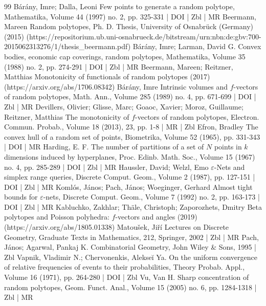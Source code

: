 \documentclass[10pt]{amsart}
\theoremstyle{definition}\newtheorem{defi}[theo]{Definition}\newtheorem{rema}[theo]{Remark}\newtheorem{exam}[theo]{Example}\newtheorem{exem}[theo]{Example}\newtheorem{nota}[theo]{Notation}
\begin{document}
\begin{thebibliography}{99}
Bárány, Imre; Dalla, Leoni Few points to generate a random polytope, Mathematika, Volume 44 (1997) no. 2, pp. 325-331 | DOI | Zbl | MR
Beermann, Mareen Random polytopes, Ph. D. Thesis, University of Osnabrück (Germany) (2015) (https://repositorium.ub.uni-osnabrueck.de/bitstream/urn:nbn:de:gbv:700-2015062313276/1/thesis\_beermann.pdf)
Bárány, Imre; Larman, David G. Convex bodies, economic cap coverings, random polytopes, Mathematika, Volume 35 (1988) no. 2, pp. 274-291 | DOI | Zbl | MR
Beermann, Mareen; Reitzner, Matthias Monotonicity of functionals of random polytopes (2017) (https://arxiv.org/abs/1706.08342)
Bárány, Imre Intrinsic volumes and $f$-vectors of random polytopes, Math. Ann., Volume 285 (1989) no. 4, pp. 671-699 | DOI | Zbl | MR
Devillers, Olivier; Glisse, Marc; Goaoc, Xavier; Moroz, Guillaume; Reitzner, Matthias The monotonicity of $f$-vectors of random polytopes, Electron. Commun. Probab., Volume 18 (2013), 23, pp. 1-8 | MR | Zbl
Efron, Bradley The convex hull of a random set of points, Biometrika, Volume 52 (1965), pp. 331-343 | DOI | MR
Harding, E. F. The number of partitions of a set of ${N}$ points in $k$ dimensions induced by hyperplanes, Proc. Edinb. Math. Soc., Volume 15 (1967) no. 4, pp. 285-289 | DOI | Zbl | MR
Haussler, David; Welzl, Emo $\varepsilon $-Nets and simplex range queries, Discrete Comput. Geom., Volume 2 (1987), pp. 127-151 | DOI | Zbl | MR
Komlós, János; Pach, János; Woeginger, Gerhard Almost tight bounds for $\varepsilon $-nets, Discrete Comput. Geom., Volume 7 (1992) no. 2, pp. 163-173 | DOI | Zbl | MR
Kabluchko, Zakhlar; Thäle, Christoph; Zaporozhets, Dmitry Beta polytopes and Poisson polyhedra: $f$-vectors and angles (2019) (https://arxiv.org/abs/1805.01338)
Matoušek, Jiří Lectures on Discrete Geometry, Graduate Texts in Mathematics, 212, Springer, 2002 | Zbl | MR
Pach, János; Agarwal, Pankaj K. Combinatorial Geometry, John Wiley \& Sons, 1995 | Zbl
Vapnik, Vladimir N.; Chervonenkis, Alekseĭ Ya. On the uniform convergence of relative frequencies of events to their probabilities, Theory Probab. Appl., Volume 16 (1971), pp. 264-280 | DOI | Zbl
Vu, Van H. Sharp concentration of random polytopes, Geom. Funct. Anal., Volume 15 (2005) no. 6, pp. 1284-1318 | Zbl | MR
\end{thebibliography}
\end{document}
